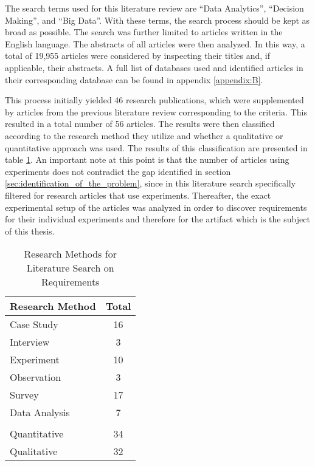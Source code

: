 The search terms used for this literature review are \enquote{Data Analytics}, \enquote{Decision Making}, and \enquote{Big Data}. With these terms, the search process should be kept as broad as possible. The search was further limited to articles written in the English language. The abstracts of all articles were then analyzed. In this way, a total of 19,955 articles were considered by inspecting their titles and, if applicable, their abstracts. A full list of databases used and identified articles in their corresponding database can be found in appendix \ref{appendix:B}.

This process initially yielded 46 research publications, which were supplemented by articles from the previous literature review corresponding to the criteria. This resulted in a total number of 56 articles. The results were then classified according to the research method they utilize and whether a qualitative or quantitative approach was used. The results of this classification are presented in table \ref{tab:secondLiteratureSearch}. An important note at this point is that the number of articles using experiments does not contradict the gap identified in section \ref{sec:identification_of_the_problem}, since in this literature search specifically filtered for research articles that use experiments. Thereafter, the exact experimental setup of the articles was analyzed in order to discover requirements for their individual experiments and therefore for the artifact which is the subject of this thesis.


\begin{table}[htbp]
    \centering
    \small
    \begin{tabular}{ll}
    \hline
    \multicolumn{1}{l}{Research Method} & \multicolumn{1}{l}{Total} \\ \hline
    \multicolumn{1}{l}{Case  Study}     & \multicolumn{1}{c}{16}    \\ 
    \multicolumn{1}{l}{Interview}       & \multicolumn{1}{c}{3}     \\ 
    \multicolumn{1}{l}{Experiment}      & \multicolumn{1}{c}{10}    \\ 
    \multicolumn{1}{l}{Observation}     & \multicolumn{1}{c}{3}     \\ 
    \multicolumn{1}{l}{Survey}          & \multicolumn{1}{c}{17}    \\ 
    \multicolumn{1}{l}{Data Analysis}   & \multicolumn{1}{c}{7}     \\ 
                                            &                            \\ \hline
    \multicolumn{1}{l}{Quantitative}    & \multicolumn{1}{c}{34}    \\ 
    \multicolumn{1}{l}{Qualitative}     & \multicolumn{1}{c}{32}    \\ \hline
    \end{tabular}
    \caption[Research Methods for Literature Search on Requirements]{Research Methods for Literature Search on Requirements}\label{tab:secondLiteratureSearch}
    \end{table}

